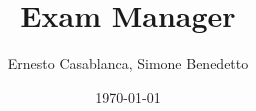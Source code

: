 \documentclass[12pt]{article}
\begin{document}
\title{Exam Manager}
\author{Ernesto Casablanca, Simone Benedetto}
\date{\today}
\makeatletter



\tableofcontents
\newpage


\pagebreak


\pagebreak


\pagebreak


\pagebreak


\pagebreak

\printglossary
\pagebreak
\printbibliography
\pagebreak


\end{document}
